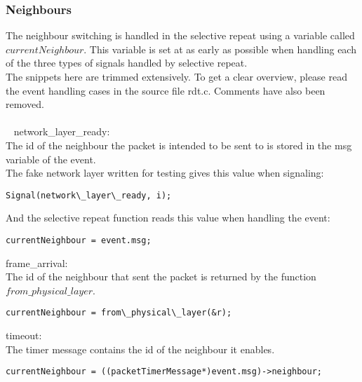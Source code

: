 \subsubsection{Neighbours}

The neighbour switching is handled in the selective repeat using a variable called $currentNeighbour$. This variable is set at as early as possible when handling each of the three types of signals handled by selective repeat.\\
The snippets here are trimmed extensively. To get a clear overview, please read the event handling cases in the source file rdt.c. Comments have also been removed.\\
\\~
network\_layer\_ready:\\
The id of the neighbour the packet is intended to be sent to is stored in the msg variable of the event.\\
The fake network layer written for testing gives this value when signaling:
\begin{lstlisting}
Signal(network\_layer\_ready, i);
\end{lstlisting}
And the selective repeat function reads this value when handling the event:
\begin{lstlisting}
currentNeighbour = event.msg;
\end{lstlisting}

frame\_arrival:\\
The id of the neighbour that sent the packet is returned by the function $from\_physical\_layer$.
\begin{lstlisting}
currentNeighbour = from\_physical\_layer(&r);
\end{lstlisting}

timeout:\\
The timer message contains the id of the neighbour it enables.
\begin{lstlisting}
currentNeighbour = ((packetTimerMessage*)event.msg)->neighbour;
\end{lstlisting}



